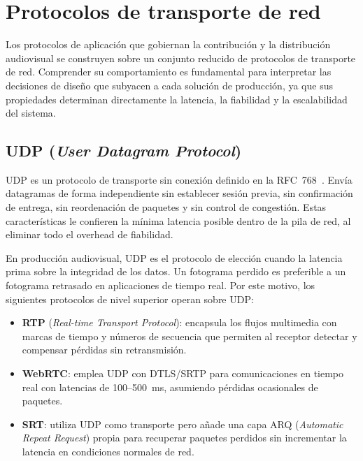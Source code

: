 \section{Protocolos de transporte de red}
\label{sec:protocolos_red}

Los protocolos de aplicación que gobiernan la contribución y la distribución audiovisual
se construyen sobre un conjunto reducido de protocolos de transporte de red. Comprender
su comportamiento es fundamental para interpretar las decisiones de diseño que subyacen
a cada solución de producción, ya que sus propiedades determinan directamente la latencia,
la fiabilidad y la escalabilidad del sistema.

\subsection{UDP (\textit{User Datagram Protocol})}

UDP es un protocolo de transporte sin conexión definido en la RFC~768~\cite{rfc768_udp}.
Envía datagramas de forma independiente sin establecer sesión previa, sin confirmación de
entrega, sin reordenación de paquetes y sin control de congestión. Estas características
le confieren la mínima latencia posible dentro de la pila de red, al eliminar todo el
overhead de fiabilidad.

En producción audiovisual, UDP es el protocolo de elección cuando la latencia prima sobre
la integridad de los datos. Un fotograma perdido es preferible a un fotograma retrasado en
aplicaciones de tiempo real. Por este motivo, los siguientes protocolos de nivel superior
operan sobre UDP:

\begin{itemize}
  \item \textbf{RTP} (\textit{Real-time Transport Protocol}): encapsula los flujos
        multimedia con marcas de tiempo y números de secuencia que permiten al receptor
        detectar y compensar pérdidas sin retransmisión.
  \item \textbf{WebRTC}: emplea UDP con DTLS/SRTP para comunicaciones en tiempo real
        con latencias de 100--500~ms, asumiendo pérdidas ocasionales de paquetes.
  \item \textbf{SRT}: utiliza UDP como transporte pero añade una capa ARQ
        (\textit{Automatic Repeat Request}) propia para recuperar paquetes perdidos
        sin incrementar la latencia en condiciones normales de red.
\end{itemize}

